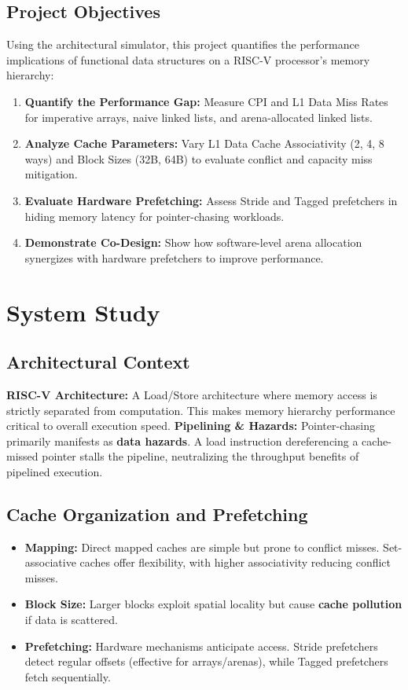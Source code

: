\documentclass[12pt, a4paper]{report}
\begin{document}
\section{Project Objectives}
Using the  architectural simulator, this project quantifies the performance implications of functional data structures on a RISC-V processor's memory hierarchy:
\begin{enumerate}
    \item \textbf{Quantify the Performance Gap:} Measure CPI and L1 Data Miss Rates for imperative arrays, naive linked lists, and arena-allocated linked lists.
    \item \textbf{Analyze Cache Parameters:} Vary L1 Data Cache Associativity (2, 4, 8 ways) and Block Sizes (32B, 64B) to evaluate conflict and capacity miss mitigation.
    \item \textbf{Evaluate Hardware Prefetching:} Assess Stride and Tagged prefetchers in hiding memory latency for pointer-chasing workloads.
    \item \textbf{Demonstrate Co-Design:} Show how software-level arena allocation synergizes with hardware prefetchers to improve performance.
\end{enumerate}

\chapter{System Study}
\section{Architectural Context}
\textbf{RISC-V Architecture:} A Load/Store architecture where memory access is strictly separated from computation. This makes memory hierarchy performance critical to overall execution speed.
\textbf{Pipelining \& Hazards:} Pointer-chasing primarily manifests as \textbf{data hazards}. A load instruction dereferencing a cache-missed pointer stalls the pipeline, neutralizing the throughput benefits of pipelined execution.

\section{Cache Organization and Prefetching}
\begin{itemize}
    \item \textbf{Mapping:} Direct mapped caches are simple but prone to conflict misses. Set-associative caches offer flexibility, with higher associativity reducing conflict misses.
    \item \textbf{Block Size:} Larger blocks exploit spatial locality but cause \textbf{cache pollution} if data is scattered.
    \item \textbf{Prefetching:} Hardware mechanisms anticipate access. Stride prefetchers detect regular offsets (effective for arrays/arenas), while Tagged prefetchers fetch sequentially.
\end{itemize}
\end{document}
